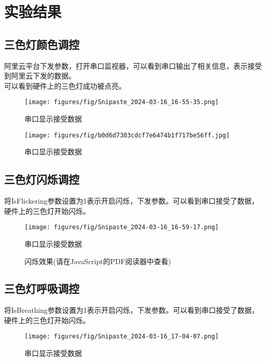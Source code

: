 \documentclass[12pt,hyperref,a4paper,UTF8]{ctexart}
\begin{document}
\section{实验结果}
\subsection{三色灯颜色调控}
    阿里云平台下发参数，打开串口监视器，可以看到串口输出了相关信息，表示接受到阿里云下发的数据。\\
    可以看到硬件上的三色灯成功被点亮。
    \begin{figure}[H]
        \centering
        \texttt{[image: figures/fig/Snipaste\_2024-03-16\_16-55-35.png]}
        \caption{串口显示接受数据}
        \label{fig:6}
    \end{figure}
    \begin{figure}[H]
        \centering
        \texttt{[image: figures/fig/b0d6d7303cdcf7e6474b1f717be56ff.jpg]}
        \caption{串口显示接受数据}
        \label{fig:6}
    \end{figure}


\subsection{三色灯闪烁调控}
    将IsFlickering参数设置为1表示开启闪烁，下发参数。可以看到串口接受了数据，硬件上的三色灯开始闪烁。
    \begin{figure}[H]
        \centering
        \texttt{[image: figures/fig/Snipaste\_2024-03-16\_16-59-17.png]}
        \caption{串口显示接受数据}
        \label{fig:6}
    \end{figure}


    \begin{figure}[ht]
            \centering
            \begin{animateinline}{6}
            \end{animateinline}
            \caption{闪烁效果(请在JavaScript的PDF阅读器中查看)}
            \label{fig:animation}
    \end{figure}



\subsection{三色灯呼吸调控}
    将IsBreathing参数设置为1表示开启闪烁，下发参数。可以看到串口接受了数据，硬件上的三色灯开始闪烁。
    \begin{figure}[H]
        \centering
        \texttt{[image: figures/fig/Snipaste\_2024-03-16\_17-04-07.png]}
        \caption{串口显示接受数据}
        \label{fig:6}
    \end{figure}
\end{document}
